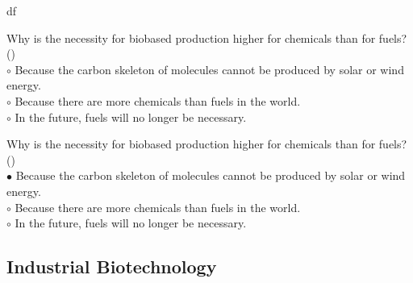 df\documentclass[]{beamer}
\begin{document}
\begin{CJK}{UTF8}{gbsn}
\begin{frame}[shrink] {}
\addtocounter{questions}{1}
\color{blue}
Why is the necessity for biobased production higher for chemicals than for fuels?
({})\\
\color{black}
\setlength{\parindent}{-0.4cm}
{\color{red}$\circ$}  Because the carbon skeleton of molecules cannot be produced by solar or wind energy.   \\
{\color{red}$\circ$} Because there are more chemicals than fuels in the world.  \\
{\color{red}$\circ$} In the future, fuels will no longer be necessary.   \\
\end{frame}
\begin{frame}[shrink] {}
\addtocounter{answers}{1}
\color{blue}
Why is the necessity for biobased production higher for chemicals than for fuels?
({})\\
\color{black}
\setlength{\parindent}{-0.4cm}
{\color{red}$\bullet$} Because the carbon skeleton of molecules cannot be produced by solar or wind energy.   \\
{\color{red}$\circ$} Because there are more chemicals than fuels in the world.  \\
{\color{red}$\circ$} In the future, fuels will no longer be necessary.   \\
\end{frame}


\subsection{ Industrial Biotechnology}
\setcounter{questions}{0}
\setcounter{answers}{0}



\end{CJK}
\end{document}
